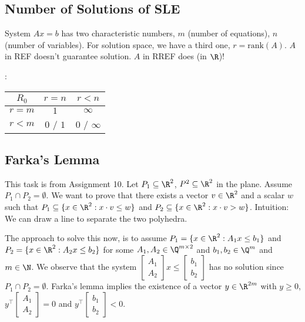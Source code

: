 \newsectionNoPB
\vspace{-0.5pc}
\subsection{Number of Solutions of SLE}
System $Ax = b$ has two characteristic numbers, $m$ (number of equations), $n$ (number of variables). For solution space, we have a third one, $r = \text{rank}(A)$. $A$ in REF doesn't guarantee solution. $A$ in RREF does (in $\R$)!

:
\begin{tabular}[h!]{|c|c|c|}
    \hline
    \rowcolor{red}$R_0$ & $r = n$   & $r < n$        \\
    \hline
    $r = m$             & $1$       & $\infty$       \\
    \hline
    $r < m$             & $0$ / $1$ & $0$ / $\infty$ \\
    \hline
\end{tabular}



\newsectionNoPB
\vspace{-0.5pc}
\subsection{Farka's Lemma}
This task is from Assignment 10.
Let $P_1 \subseteq \R^2$, $P^2 \subseteq \R^2$ in the plane.
Assume $P_1 \cap P_2 = \emptyset$.
We want to prove that there exists a vector $v \in \R^2$ and a scalar $w$ such that $P_1 \subseteq \{x \in \R^2 : x \cdot v \leq w\}$ and $P_2 \subseteq \{x \in \R^2 : x \cdot v > w\}$. Intuition: We can draw a line to separate the two polyhedra.

The approach to solve this now, is to assume $P_1 = \{x \in \R^2 : A_1 x \leq b_1\}$ and $P_2 = \{x \in \R^2 : A_2 x \leq b_2\}$ for some $A_1, A_2 \in \Q^{m \times 2}$ and $b_1, b_2 \in \Q^m$ and $m \in \N$.
We observe that the system $\begin{bmatrix}A_1 \\ A_2\end{bmatrix} x \leq \begin{bmatrix}b_1\\b_2\end{bmatrix}$ has no solution since $P_1 \cap P_2 = \emptyset$.
Farka's lemma implies the existence of a vector $y \in \R^{2m}$ with $y \geq 0$, $y^{\top} \begin{bmatrix}A_1\\A_2\end{bmatrix} = 0$ and $y^{\top} \begin{bmatrix}b_1 \\b_2\end{bmatrix} < 0$.



